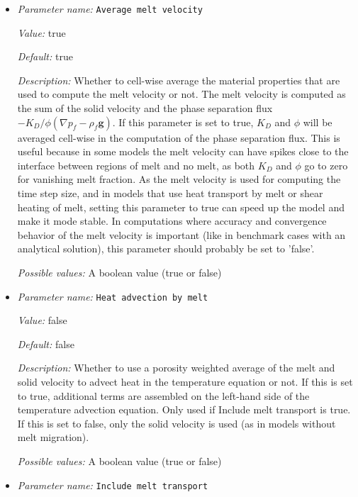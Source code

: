 \begin{itemize}
\item {\it Parameter name:} {\tt Average melt velocity}
\label{parameters:Melt settings/Average melt velocity}
\label{parameters:Melt_20settings/Average_20melt_20velocity}


{\it Value:} true


{\it Default:} true


{\it Description:} Whether to cell-wise average the material properties that are used to compute the melt velocity or not. The melt velocity is computed as the sum of the solid velocity and the phase separation flux $ - K_D / \phi (\nabla p_f - \rho_f \mathbf g)$. If this parameter is set to true, $K_D$ and $\phi$ will be averaged cell-wise in the computation of the phase separation flux. This is useful because in some models the melt velocity can have spikes close to the interface between regions of melt and no melt, as both $K_D$ and $\phi$ go to zero for vanishing melt fraction. As the melt velocity is used for computing the time step size, and in models that use heat transport by melt or shear heating of melt, setting this parameter to true can speed up the model and make it mode stable. In computations where accuracy and convergence behavior of the melt velocity is important (like in benchmark cases with an analytical solution), this parameter should probably be set to 'false'.


{\it Possible values:} A boolean value (true or false)
\item {\it Parameter name:} {\tt Heat advection by melt}
\label{parameters:Melt settings/Heat advection by melt}
\label{parameters:Melt_20settings/Heat_20advection_20by_20melt}


{\it Value:} false


{\it Default:} false


{\it Description:} Whether to use a porosity weighted average of the melt and solid velocity to advect heat in the temperature equation or not. If this is set to true, additional terms are assembled on the left-hand side of the temperature advection equation. Only used if Include melt transport is true. If this is set to false, only the solid velocity is used (as in models without melt migration).


{\it Possible values:} A boolean value (true or false)
\item {\it Parameter name:} {\tt Include melt transport}
\label{parameters:Melt settings/Include melt transport}
\label{parameters:Melt_20settings/Include_20melt_20transport}



\end{itemize}
